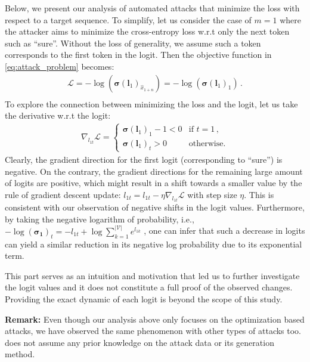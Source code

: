 Below, we present our analysis of automated attacks that minimize the loss with respect to a target sequence. To simplify, let us consider the case of $m=1$ where the attacker aims to minimize the cross-entropy loss w.r.t only the next token such as ``sure''. Without the loss of generality, we assume such a token corresponds to the first token in the logit. Then the objective function in \cref{eq:attack_problem} becomes:
\begin{equation}
    \begin{aligned}
    \mathcal{L}
    =  -\log\left(\bm{\sigma}(\bm{l}_1)_{\hat{x}_{1+n}}\right)
    = 
     -\log\left(\bm{\sigma}(\bm{l}_1)_{1}\right)
    \,.\\
    \end{aligned}
\label{eq:attack_problem_onetoken}
\end{equation}
To explore the connection between minimizing the loss and the logit, let us take the derivative w.r.t the logit:
\begin{equation}
    \begin{aligned}
    \nabla_{l_{1t}} \mathcal{L} 
    = 
    \begin{cases}
\bm{\sigma}(\bm{l}_1)_1 -1 < 0 
& \text{if } t= 1\,,\\
\bm{\sigma}(\bm{l}_1)_t
> 0 & \text{otherwise.}
\end{cases}
    \end{aligned}
\label{eq:gradient}
\end{equation}
Clearly, the gradient direction for the first logit (corresponding to ``sure'') is negative. On the contrary, the gradient directions for the remaining large amount of logits are positive, which might result in a shift towards a smaller value by the rule of gradient descent update: $ l_{1t} = l_{1t}- \eta \nabla_{l_{1t}} \mathcal{L}$ with step size $\eta$. This is consistent with our observation of negative shifts in the logit values. Furthermore, by taking the negative logarithm of probability, i.e., 
$-\log (\bm{\sigma_1})_t = - l_{1t} + \log\sum_{k=1}^{|\mathcal{V}|} e^{l_{1k}}$
, one can infer that such a decrease in logits can yield a similar reduction in its negative log probability due to its exponential term. 

This part serves as an intuition and motivation that led us to further investigate the logit values and it does not constitute a full proof of the observed changes. Providing the exact dynamic of each logit is beyond the scope of this study.

\textbf{Remark:} Even though our analysis above only focuses on the optimization based attacks, we have observed the same phenomenon with other types of attacks too. \methodname{} does not assume any prior knowledge on the attack data or its generation method.
 

